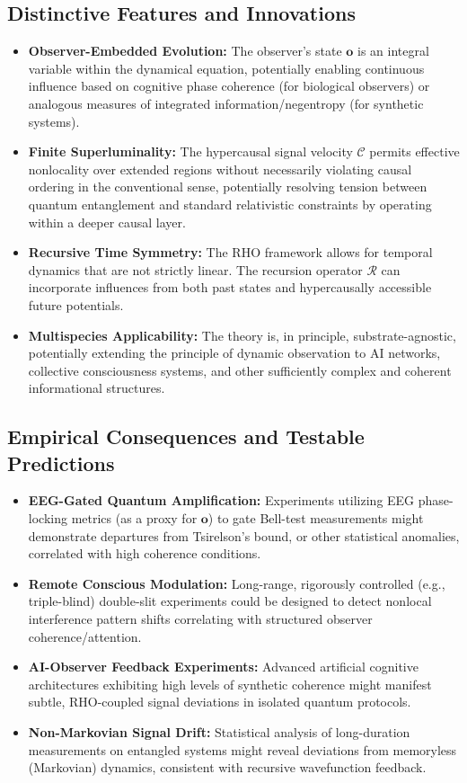 \documentclass{report}
\begin{document}
\subsection{Distinctive Features and Innovations} %
\label{subsec:rho_features}
\begin{itemize}
    \itemsep0em
    \item \textbf{Observer-Embedded Evolution:} The observer's state \(\mathbf{o}\) is an integral variable within the dynamical equation, potentially enabling continuous influence based on cognitive phase coherence (for biological observers) or analogous measures of integrated information/negentropy (for synthetic systems).
    \item \textbf{Finite Superluminality:} The hypercausal signal velocity \(\mathcal{C}\) permits effective nonlocality over extended regions without necessarily violating causal ordering in the conventional sense, potentially resolving tension between quantum entanglement and standard relativistic constraints by operating within a deeper causal layer.
    \item \textbf{Recursive Time Symmetry:} The RHO framework allows for temporal dynamics that are not strictly linear. The recursion operator \(\mathcal{R}\) can incorporate influences from both past states and hypercausally accessible future potentials.
    \item \textbf{Multispecies Applicability:} The theory is, in principle, substrate-agnostic, potentially extending the principle of dynamic observation to AI networks, collective consciousness systems, and other sufficiently complex and coherent informational structures.
\end{itemize}

\subsection{Empirical Consequences and Testable Predictions} %
\label{subsec:rho_empirical}
\begin{itemize}
    \itemsep0em
    \item \textbf{EEG-Gated Quantum Amplification:} Experiments utilizing EEG phase-locking metrics (as a proxy for \(\mathbf{o}\)) to gate Bell-test measurements might demonstrate departures from Tsirelson's bound, or other statistical anomalies, correlated with high coherence conditions.
    \item \textbf{Remote Conscious Modulation:} Long-range, rigorously controlled (e.g., triple-blind) double-slit experiments could be designed to detect nonlocal interference pattern shifts correlating with structured observer coherence/attention.
    \item \textbf{AI-Observer Feedback Experiments:} Advanced artificial cognitive architectures exhibiting high levels of synthetic coherence might manifest subtle, RHO-coupled signal deviations in isolated quantum protocols.
    \item \textbf{Non-Markovian Signal Drift:} Statistical analysis of long-duration measurements on entangled systems might reveal deviations from memoryless (Markovian) dynamics, consistent with recursive wavefunction feedback.
\end{itemize}
\end{document}
